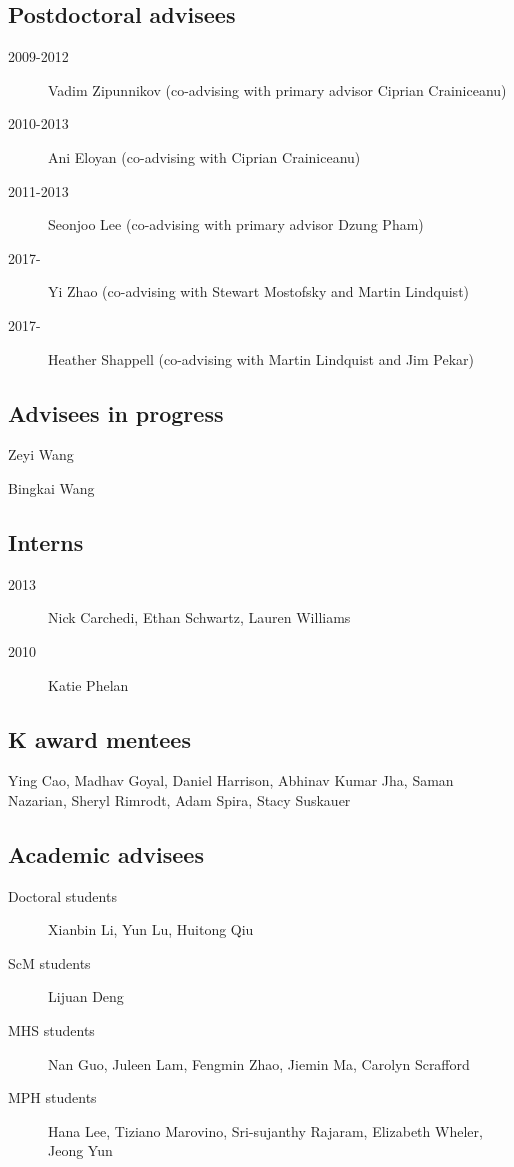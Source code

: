 \documentclass[12pt]{article}
\begin{document}
\subsection*{Postdoctoral advisees}
\begin{description}
\item[\textnormal{2009-2012}] Vadim Zipunnikov (co-advising with primary advisor Ciprian Crainiceanu)
\item[\textnormal{2010-2013}] Ani Eloyan (co-advising with Ciprian Crainiceanu)
\item[\textnormal{2011-2013}] Seonjoo Lee (co-advising with primary advisor Dzung Pham)
\item[\textnormal{2017-}] Yi Zhao (co-advising with Stewart Mostofsky and Martin Lindquist)
\item[\textnormal{2017-}] Heather Shappell (co-advising with Martin Lindquist and Jim Pekar)
\end{description}

\subsection*{Advisees in progress}
\begin{description}
\item Zeyi Wang
\item Bingkai Wang
\end{description}

\subsection*{Interns}
\begin{description}
\item[\textnormal{2013}] Nick Carchedi, Ethan Schwartz, Lauren Williams
\item[\textnormal{2010}] Katie Phelan
\end{description}

\subsection*{K award mentees}
Ying Cao, Madhav Goyal, Daniel Harrison, Abhinav Kumar Jha, 
Saman Nazarian, Sheryl Rimrodt, Adam Spira, Stacy Suskauer

\subsection*{Academic advisees}
\begin{description}
\item[\textnormal{Doctoral students}] Xianbin Li, Yun Lu, Huitong Qiu 
\item[\textnormal{ScM students}]  Lijuan Deng  
\item[\textnormal{MHS students}]  Nan Guo, Juleen Lam, Fengmin Zhao, Jiemin Ma, Carolyn Scrafford
\item[\textnormal{MPH students}]  Hana Lee, Tiziano Marovino, Sri-sujanthy Rajaram, Elizabeth Wheler, Jeong Yun 
\end{description}
\end{document}
